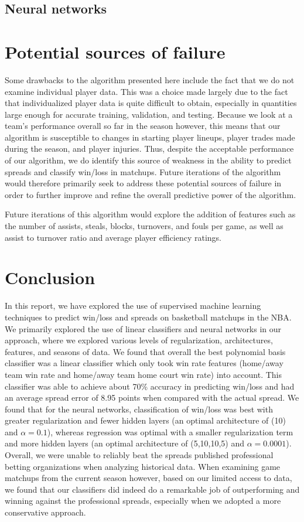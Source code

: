 \documentclass{article}
\begin{document}
\subsection{Neural networks}


\section{Potential sources of failure}
Some drawbacks to the algorithm presented here include the fact that we do not examine individual player data. This was a choice made largely due to the fact that individualized player data is quite difficult to obtain, especially in quantities large enough for accurate training, validation, and testing. Because we look at a team's performance overall so far in the season however, this means that our algorithm is susceptible to changes in starting player lineups, player trades made during the season, and player injuries. Thus, despite the acceptable performance of our algorithm, we do identify this source of weakness in the ability to predict spreads and classify win/loss in matchups. Future iterations of the algorithm would therefore primarily seek to address these potential sources of failure in order to further improve and refine the overall predictive power of the algorithm.

Future iterations of this algorithm would explore the addition of features such as the number of assists, steals, blocks, turnovers, and fouls per game, as well as assist to turnover ratio and average player efficiency ratings.

\section{Conclusion}
In this report, we have explored the use of supervised machine learning techniques to predict win/loss and spreads on basketball matchups in the NBA. We primarily explored the use of linear classifiers and neural networks in our approach, where we explored various levels of regularization, architectures, features, and seasons of data. We found that overall the best polynomial basis classifier was a linear classifier which only took win rate features (home/away team win rate and home/away team home court win rate) into account. This classifier was able to achieve about 70\% accuracy in predicting win/loss and had an average spread error of 8.95 points when compared with the actual spread. We found that for the neural networks, classification of win/loss was best with greater regularization and fewer hidden layers (an optimal architecture of (10) and $\alpha = 0.1$), whereas regression was optimal with a smaller regularization term and more hidden layers (an optimal architecture of (5,10,10,5) and $\alpha = 0.0001$). Overall, we were unable to reliably beat the spreads published professional betting organizations when analyzing historical data. When examining game matchups from the current season however, based on our limited access to data, we found that our classifiers did indeed do a remarkable job of outperforming and winning against the professional spreads, especially when we adopted a more conservative approach.
\end{document}
